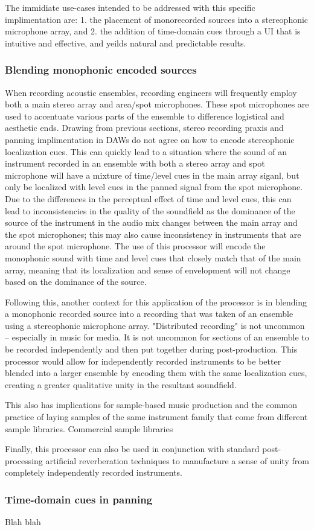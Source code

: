 The immidiate use-cases intended to be addressed with this specific implimentation are: 1. the placement of monorecorded sources into a stereophonic microphone array, and 2. the addition of time-domain cues through a UI that is intuitive and effective, and yeilds natural and predictable results.

\subsubsection{Blending monophonic encoded sources}

When recording acoustic ensembles, recording engineers will frequently employ both a main stereo array and area/spot microphones. These spot microphones are used to accentuate various parts of the ensemble to difference logistical and aesthetic ends. Drawing from previous sections, stereo recording praxis and panning implimentation in DAWs do not agree on how to encode stereophonic localization cues. This can quickly lead to a situation where the sound of an instrument recorded in an ensemble with both a stereo array and spot microphone will have a mixture of time/level cues in the main array siganl, but only be localized with level cues in the panned signal from the spot microphone. Due to the differences in the perceptual effect of time and level cues, this can lead to inconsistencies in the quality of the soundfield as the dominance of the source of the instrument in the audio mix changes between the main array and the spot microphones; this may also cause inconsistency in instruments that are around the spot microphone. The use of this processor will encode the monophonic sound with time and level cues that closely match that of the main array, meaning that its localization and sense of envelopment will not change based on the dominance of the source.

Following this, another context for this application of the processor is in blending a monophonic recorded source into a recording that was taken of an ensemble using a stereophonic microphone array. "Distributed recording" is not uncommon -- especially in music for media. It is not uncommon for sections of an ensemble to be recorded independently and then put together during post-production. This processor would allow for independently recorded instruments to be better blended into a larger ensemble by encoding them with the same localization cues, creating a greater qualitative unity in the resultant soundfield.

This also has implications for sample-based music production and the common practice of laying samples of the same instrument family that come from different sample libraries. Commercial sample libraries 

Finally, this processor can also be used in conjunction with standard post-processing artificial reverberation techniques to manufacture a sense of unity from completely independently recorded instruments. 

\subsubsection{Time-domain cues in panning}

Blah blah